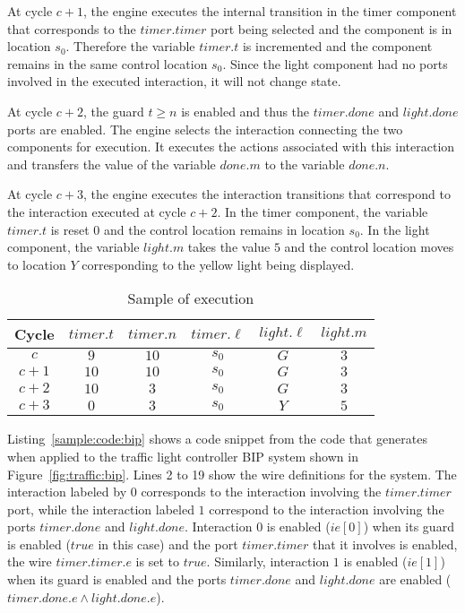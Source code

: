 At cycle $c+1$, the engine executes the internal transition in the timer component
that corresponds to the $timer.timer$ port being selected and the component is in location $s_0$. 
Therefore the variable $timer.t$ is incremented and the component 
remains in the same control location $s_0$. Since the light component
had no ports involved in the executed interaction, it will not change 
state. 

At cycle $c+2$, the guard $t \geq n$ is enabled and thus the $timer.done$ and $light.done$ ports are enabled. 
The engine selects the interaction connecting the two components
for execution. It executes the actions associated with this interaction 
and transfers the value of the variable $done.m$ to the variable $done.n$.

At cycle $c+3$, the engine executes the interaction transitions that 
correspond to the interaction executed at cycle $c+2$. In the timer 
component, the variable $timer.t$ is reset $0$ and the control location 
remains in location $s_0$. In the light component, the variable 
$light.m$ takes the value $5$ and the control location moves to location 
$Y$ corresponding to the yellow light being displayed. 

\begin{table}[bt]
\centering
\caption{Sample of \biptool{} execution}
\begin{tabular}{|c|c|c|c|c|c|}
\hline
Cycle & $timer.t$ & $timer.n$ & $timer.\ell$ & $light.\ell$ & $light.m$ \\ 
\hline
$c$ & $9$ & $10$ & $s_0$ & $G$ & $3$ \\
		\hline
		$c+1$ & $10$ & $10$ & $s_0$ & $G$ & $3$ \\
			\hline
			$c+2$ & $10$ & $3$ & $s_0$ & $G$ & $3$ \\
				\hline
	 $c+3$ & $0$ & $3$ & $s_0$ & $Y$ & $5$ \\
	 \hline
\end{tabular}
\label{tb:bip:exec}
\end{table}

Listing~\ref{sample:code:bip} shows a code snippet from the code that \biptool{} generates
when applied to the traffic light controller BIP system shown in Figure~\ref{fig:traffic:bip}.
Lines 2 to 19 show the wire definitions for the system. The interaction 
labeled by $0$ corresponds to the interaction involving the $timer.timer$
port, while the interaction labeled $1$ correspond to the interaction 
involving the ports $timer.done$ and $light.done$. 
Interaction $0$ is enabled ($ie[0]$) when its guard is enabled ($true$ 
in this case) and the port $timer.timer$ that it involves is enabled, 
\ie{} the wire $timer.timer.e$ is set to $true$. 
Similarly, interaction $1$ is enabled ($ie[1]$) when its guard is
enabled and the ports $timer.done$ and $light.done$ are enabled 
($timer.done.e \land light.done.e$).

